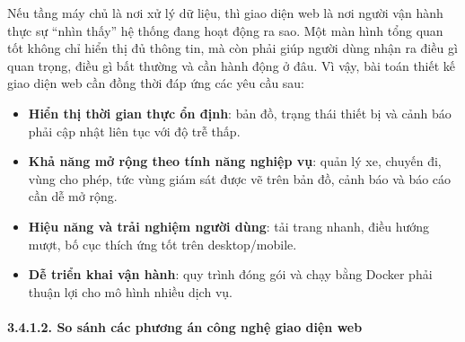 \documentclass[a4paper]{extarticle}
\providecommand{\tightlist}{%
  \setlength{\itemsep}{0pt}\setlength{\parskip}{0pt}}
\begin{document}
Nếu tầng máy chủ là nơi xử lý dữ liệu, thì giao diện web là nơi người vận
hành thực sự ``nhìn thấy'' hệ thống đang hoạt động ra sao. Một màn hình
tổng quan tốt không
chỉ hiển thị đủ thông tin, mà còn phải giúp người dùng nhận ra điều gì
quan trọng, điều gì bất thường và cần hành động ở đâu. Vì vậy, bài toán
thiết kế giao diện web cần đồng thời đáp ứng các yêu cầu sau:

\begin{itemize}
\tightlist
\item
  \textbf{Hiển thị thời gian thực ổn định}: bản đồ, trạng thái thiết bị
  và cảnh báo phải cập nhật liên tục với độ trễ thấp.
\item
  \textbf{Khả năng mở rộng theo tính năng nghiệp vụ}: quản lý xe, chuyến
  đi, vùng cho phép, tức vùng giám sát được vẽ trên bản đồ, cảnh báo và báo
  cáo cần dễ mở rộng.
\item
  \textbf{Hiệu năng và trải nghiệm người dùng}: tải trang nhanh, điều
  hướng mượt, bố cục thích ứng tốt trên desktop/mobile.
\item
  \textbf{Dễ triển khai vận hành}: quy trình đóng gói và chạy bằng
  Docker phải thuận lợi cho mô hình nhiều dịch vụ.
\end{itemize}

\paragraph{3.4.1.2. So sánh các phương án công nghệ
giao diện web}\label{3142-so-suxe1nh-cuxe1c-phux1b0ux1a1ng-uxe1n-cuxf4ng-nghux1ec7-frontend}
\end{document}
